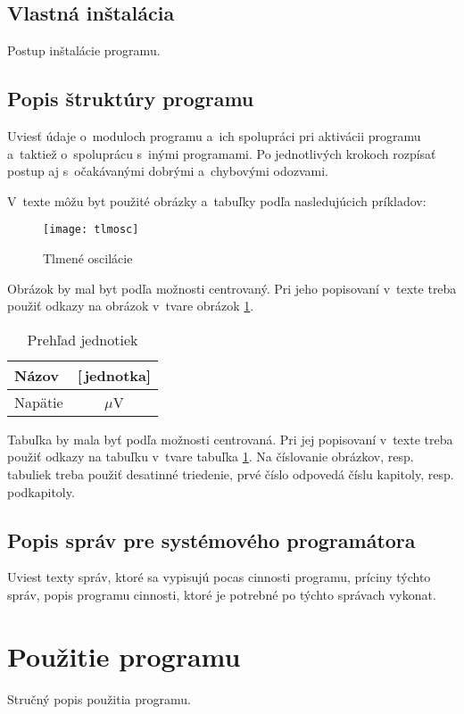 \documentclass[a4paper]{pouzivatelskaPrirucka}
\begin{document}
\subsection{Vlastná inštalácia}

Postup inštalácie programu.

\subsection{Popis štruktúry programu}

Uviesť údaje o~moduloch  programu a~ich spolupráci pri aktivácii programu a~taktiež             o~spoluprácu s~inými programami. Po jednotlivých krokoch rozpísať postup aj s~očakávanými  dobrými a~chybovými odozvami.

V~texte môžu byt použité obrázky a~tabuľky  podľa nasledujúcich príkladov:

\begin{figure}[!ht]
\centering 
\texttt{[image: tlmosc]}
\caption{Tlmené oscilácie}\label{o:1}
\end{figure}

Obrázok by mal byt podľa možnosti centrovaný. Pri jeho popisovaní v~texte treba použiť odkazy na obrázok v~tvare obrázok \ref{o:1}.

\begin{table}[!ht]\caption{Prehľad jednotiek}\label{t:1}
\smallskip
\centering
\begin{tabular}{|l|c|} \hline
Názov	& [\,jednotka] \\ \hline
Napätie & $\mu$V \\ \hline
\end{tabular}	
\end{table}

Tabuľka by mala byť podľa možnosti centrovaná. Pri jej popisovaní v~texte treba použiť odkazy na tabuľku v~tvare tabuľka \ref{t:1}.
Na číslovanie obrázkov, resp. tabuliek treba použiť desatinné triedenie, prvé číslo odpovedá číslu kapitoly, resp. podkapitoly.

\subsection{Popis správ pre systémového programátora}

Uviest texty správ, ktoré sa vypisujú pocas cinnosti programu, príciny týchto správ, popis programu cinnosti, ktoré je potrebné po týchto správach vykonat.

\newpage\section{Použitie programu}
Stručný popis použitia programu.
\end{document}
